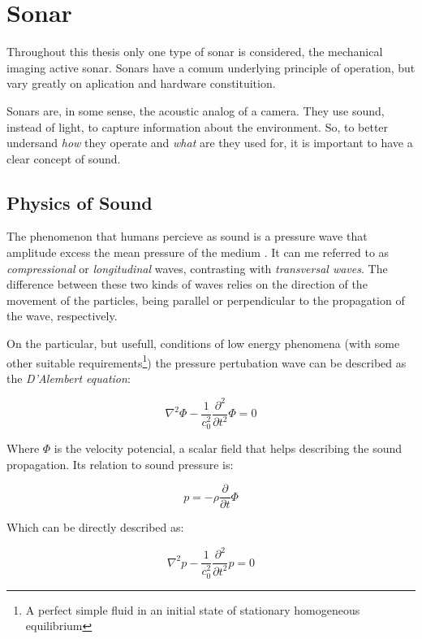 \section{Sonar}

Throughout this thesis only one type of sonar is considered, the mechanical
imaging active sonar. Sonars have a comum underlying principle of operation, but
vary greatly on aplication and hardware constituition.

Sonars are, in some sense, the acoustic analog of a camera. They use sound,
instead of light, to capture information about the environment. So, to better
undersand \textit{how} they operate and \textit{what} are they used for, it is
important to have a clear concept of sound.

\subsection{Physics of Sound}

The phenomenon that humans percieve as sound is a pressure wave that amplitude
excess the mean pressure of the medium \cite{FEYNMAN}. It can me referred to as
\textit{compressional} or \textit{longitudinal} waves, contrasting with
\textit{transversal waves}. The difference between these two kinds of waves
relies on the direction of the movement of the particles, being parallel or
perpendicular to the propagation of the wave, respectively\cite{BRUNEAU}.

On the particular, but usefull, conditions of low energy
phenomena\cite{Lefebvre} (with some other suitable requirements\footnote{A
perfect simple fluid in an initial state of stationary homogeneous equilibrium})
the pressure pertubation wave can be described as the \textit{D'Alembert
equation}:
 
\begin{equation}\label{eq:lambert}
\nabla^2 \Phi - \frac{1}{c^2_0}\frac{\partial^2}{\partial t^2} \Phi = 0
\end{equation}

Where $\Phi$ is the velocity potencial, a scalar field that helps describing the
sound propagation. Its relation to sound pressure is:

\[ p =  -\rho \frac{\partial}{\partial t}\Phi \]

Which can be directly described as:

\begin{equation} \label{eq:wave}
\nabla^2 p - \frac{1}{c^2_0}\frac{\partial^2}{\partial t^2} p = 0
\end{equation} 
 
